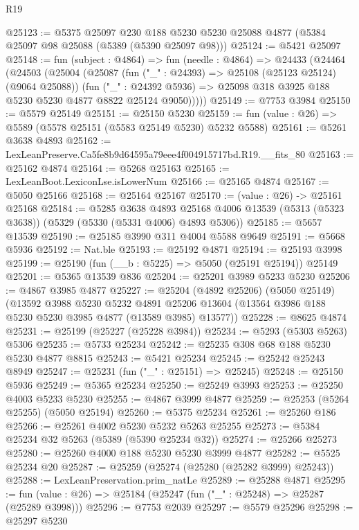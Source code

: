 \begin{lexlean}{R19}
\begin{coremodule}
@25123 := @5375
    @25097
    @230
    @188
    @5230
    @5230
    @25088
    @4877
    (@5384 @25097 @98 @25088 (@5389 (@5390 @25097 @98)))
@25124 := @5421 @25097
@25148 := fun (subject : @4864) =>
  fun (needle : @4864) =>
  @24433
    (@24464
      (@24503
        (@25004
          (@25087
            (fun ("_" : @24393) => @25108 (@25123 @25124) (@9064 @25088))
            (fun ("_" : @24392 @5936) =>
            @25098 @318 @3925 @188 @5230 @5230 @4877 @8822 @25124 @9050)))))
@25149 := @7753 @3984
@25150 := @5579 @25149
@25151 := @25150 @5230
@25159 := fun (value : @26) => @5589 (@5578 @25151 (@5583 @25149 @5230) @5232 @5588)
@25161 := @5261 @3638 @4893
@25162 := LexLeanPreserve.Ca5fe8b9d64595a79eee4f004915717bd.R19.__fits_80
@25163 := @25162 @4874
@25164 := @5268 @25163
@25165 := LexLeanBoot.LexiconLse.isLowerNum
@25166 := @25165 @4874
@25167 := @5050 @25166
@25168 := @25164 @25167
@25170 := (value : @26) -> @25161 @25168
@25184 := @5285
    @3638
    @4893
    @25168
    @4006
    @13539
    (@5313 (@5323 @3638))
    (@5329 (@5330 (@5331 @4006) @4893 @5306))
@25185 := @5657 @13539
@25190 := @25185 @3990 @311 @4004 @5588 @9649
@25191 := @5668 @5936
@25192 := Nat.ble
@25193 := @25192 @4871
@25194 := @25193 @3998
@25199 := @25190 (fun (__b : @5225) => @5050 (@25191 @25194)) @25149
@25201 := @5365 @13539 @836
@25204 := @25201 @3989 @5233 @5230
@25206 := @4867 @3985 @4877
@25227 := @25204
    (@4892 @25206)
    (@5050 @25149)
    (@13592
      @3988
      @5230
      @5232
      @4891
      @25206
      @13604
      (@13564 @3986 @188 @5230 @5230 @3985 @4877 (@13589 @3985) @13577))
@25228 := @8625 @4874
@25231 := @25199 (@25227 (@25228 @3984))
@25234 := @5293 (@5303 @5263) @5306
@25235 := @5733 @25234
@25242 := @25235 @308 @68 @188 @5230 @5230 @4877 @8815
@25243 := @5421 @25234
@25245 := @25242 @25243 @8949
@25247 := @25231 (fun ("_" : @25151) => @25245)
@25248 := @25150 @5936
@25249 := @5365 @25234
@25250 := @25249 @3993
@25253 := @25250 @4003 @5233 @5230
@25255 := @4867 @3999 @4877
@25259 := @25253 (@5264 @25255) (@5050 @25194)
@25260 := @5375 @25234
@25261 := @25260 @186
@25266 := @25261 @4002 @5230 @5232 @5263 @25255
@25273 := @5384 @25234 @32 @5263 (@5389 (@5390 @25234 @32))
@25274 := @25266 @25273
@25280 := @25260 @4000 @188 @5230 @5230 @3999 @4877
@25282 := @5525 @25234 @20
@25287 := @25259 (@25274 (@25280 (@25282 @3999) @25243))
@25288 := LexLeanPreservation.prim_natLe
@25289 := @25288 @4871
@25295 := fun (value : @26) => @25184 (@25247 (fun ("_" : @25248) => @25287 (@25289 @3998)))
@25296 := @7753 @2039
@25297 := @5579 @25296
@25298 := @25297 @5230

\end{coremodule}
\end{lexlean}

